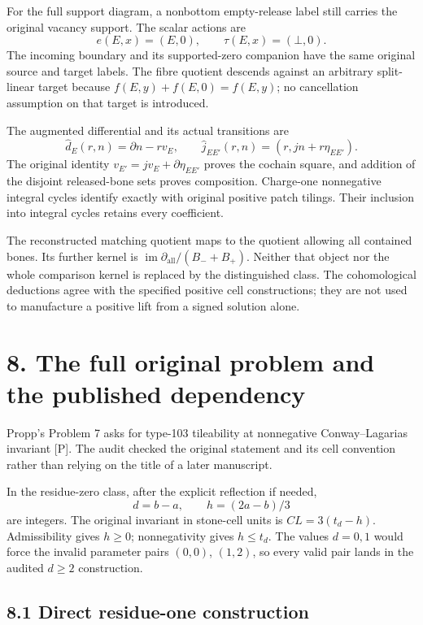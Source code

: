 \documentclass[
  11pt,
]{article}
\begin{document}
For the full support diagram, a nonbottom empty-release label still
carries the original vacancy support. The scalar actions are \[
e(E,x)=(E,0),\qquad \tau(E,x)=(\bot,0).
\] The incoming boundary and its supported-zero companion have the same
original source and target labels. The fibre quotient descends against
an arbitrary split-linear target because \(f(E,y)+f(E,0)=f(E,y)\); no
cancellation assumption on that target is introduced.

The augmented differential and its actual transitions are \[
\widehat d_E(r,n)=\partial n-rv_E,
\qquad
\widehat j_{EE'}(r,n)=(r,jn+r\eta_{EE'}).
\] The original identity \(v_{E'}=jv_E+\partial\eta_{EE'}\) proves the
cochain square, and addition of the disjoint released-bone sets proves
composition. Charge-one nonnegative integral cycles identify exactly
with original positive patch tilings. Their inclusion into integral
cycles retains every coefficient.

The reconstructed matching quotient maps to the quotient allowing all
contained bones. Its further kernel is
\(\operatorname{im}\partial_{\mathrm{all}}/(B_-+B_+)\). Neither that
object nor the whole comparison kernel is replaced by the distinguished
class. The cohomological deductions agree with the specified positive
cell constructions; they are not used to manufacture a positive lift
from a signed solution alone.

\section{8. The full original problem and the published
dependency}\label{the-full-original-problem-and-the-published-dependency}

Propp's Problem 7 asks for type-103 tileability at nonnegative
Conway--Lagarias invariant {[}P{]}. The audit checked the original
statement and its cell convention rather than relying on the title of a
later manuscript.

In the residue-zero class, after the explicit reflection if needed, \[
d=b-a,\qquad h=(2a-b)/3
\] are integers. The original invariant in stone-cell units is
\(CL=3(t_d-h)\). Admissibility gives \(h\ge0\); nonnegativity gives
\(h\le t_d\). The values \(d=0,1\) would force the invalid parameter
pairs \((0,0)\), \((1,2)\), so every valid pair lands in the audited
\(d\ge2\) construction.

\subsection{8.1 Direct residue-one
construction}\label{direct-residue-one-construction}
\end{document}
